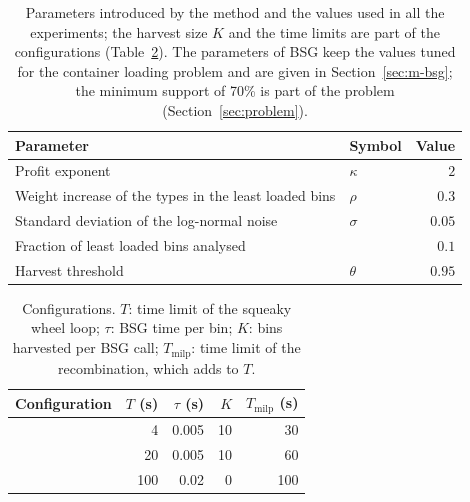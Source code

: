 \begin{table}[t]
\centering
\caption{Parameters introduced by the method and the values used in all the experiments; the harvest size $K$ and the
time limits are part of the configurations (Table~\ref{tab:configs}). The parameters of BSG keep the values tuned for the
container loading problem \citep{Araya2017} and are given in Section~\ref{sec:m-bsg}; the minimum support of 70\% is part
of the problem (Section~\ref{sec:problem}).}
\label{tab:params}
\begin{tabular}{@{}llr@{}}
\toprule
Parameter & Symbol & Value\\
\midrule
Profit exponent & $\kappa$ & $2$\\
Weight increase of the types in the least loaded bins & $\rho$ & $0.3$\\
Standard deviation of the log-normal noise & $\sigma$ & $0.05$\\
Fraction of least loaded bins analysed & & $0.1$\\
Harvest threshold & $\theta$ & $0.95$\\
\bottomrule
\end{tabular}
\end{table}

\begin{table}[t]
\centering
\caption{Configurations. $T$: time limit of the squeaky wheel loop; $\tau$: BSG time per bin;
$K$: bins harvested per BSG call; $T_{\mathrm{milp}}$: time limit of the recombination, which adds to $T$.}
\label{tab:configs}
\begin{tabular}{@{}lrrrr@{}}
\toprule
Configuration & $T$ (s) & $\tau$ (s) & $K$ & $T_{\mathrm{milp}}$ (s)\\
\midrule
\cfgfast{}   & 4   & 0.005 & 10 & 30\\
\cfgbal{}  & 20  & 0.005 & 10 & 60\\
\cfgqual{} & 100 & 0.02  & 0  & 100\\
\bottomrule
\end{tabular}
\end{table}
